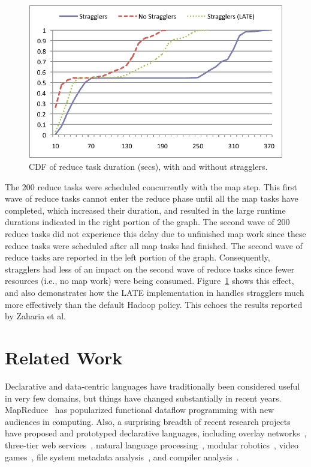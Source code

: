 \begin{figure}
\ssp
  \centering
  \includegraphics[scale=0.75]{figures/reduce_stragglers}
  \caption{CDF of reduce task duration (secs), with and without stragglers.}
  \label{fig:ec2reduce}
\end{figure}

The 200 reduce tasks were scheduled concurrently with the map step.  This first
wave of reduce tasks cannot enter the reduce phase until all the map tasks have
completed, which increased their duration, and resulted in the large runtime
durations indicated in the right portion of the graph.  The second wave of 200
reduce tasks did not experience this delay due to unfinished map work since
these reduce tasks were scheduled after all map tasks had finished.  The second
wave of reduce tasks are reported in the left portion of the graph.
Consequently, stragglers had less of an impact on the second wave of reduce
tasks since fewer resources (i.e., no map work) were being consumed.
Figure~\ref{fig:ec2reduce} shows this effect, and also demonstrates how the
LATE implementation in {\BOOMA} handles stragglers much more effectively than
the default Hadoop policy.  This echoes the results reported by Zaharia et
al.~\cite{zaharia-late}

\section{Related Work}
\label{ch:boom:sec:relwork}

Declarative and data-centric languages have traditionally been considered useful
in very few domains, but things have changed substantially in recent years.
MapReduce~\cite{mapreduce-osdi} has popularized functional dataflow programming
with new audiences in computing.  Also, a surprising breadth of recent research
projects have proposed and prototyped declarative languages, including overlay
networks~\cite{p2:sosp}, three-tier web services~\cite{hilda}, natural language
processing~\cite{dyna}, modular robotics~\cite{meld}, video games~\cite{cornellgames}, 
file system metadata analysis~\cite{wiscfsck}, and compiler analysis~\cite{bddbddb}.

